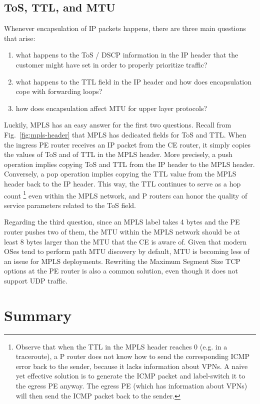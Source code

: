 \documentclass{article}
\begin{document}
%
%
\subsection{ToS, TTL, and MTU}
Whenever encapsulation of IP packets happens, there are three main questions 
that arise:
\begin{enumerate}
 \item what happens to the ToS / DSCP information in the IP header that the 
customer might have set in order to properly prioritize traffic?
 \item what happens to the TTL field in the IP header and how does 
encapsulation cope with forwarding loops?
 \item how does encapsulation affect MTU for upper layer protocols?
\end{enumerate}

Luckily, MPLS has an easy answer for the first two questions. Recall from 
Fig.~\ref{fig:mpls-header} that MPLS has dedicated fields for ToS and TTL. When 
the ingress PE router receives an IP packet from the CE router, it simply copies 
the values of ToS and of TTL in the MPLS header. More precisely, a push operation 
implies copying ToS and TTL from the IP header to the MPLS header. Conversely, a 
pop operation implies copying the TTL value from the MPLS header back to the IP 
header. This way, the TTL continues to serve as a hop count%
% 
\footnote{Observe that when the TTL in the MPLS header reaches $0$ (e.g. in a 
traceroute), a P router does not know how to send the corresponding ICMP error 
back to the sender, because it lacks information about VPNs. A naive yet 
effective solution is to generate the ICMP packet and label-switch it to the 
egress PE anyway. The egress PE (which has information about VPNs) will then 
send the ICMP packet back to the sender.} 
% 
even within the MPLS network, and P routers can honor the quality of service 
parameters related to the ToS field.

Regarding the third question, since an MPLS label takes 4 bytes and the PE 
router pushes two of them, the MTU within the MPLS network should be at least 8 
bytes larger than the MTU that the CE is aware of. Given that modern OSes tend 
to perform path MTU discovery by default, MTU is becoming less of an issue for 
MPLS deployments. Rewriting the Maximum Segment Size TCP options at the PE router is also a 
common solution, even though it does not support UDP traffic.


\section{Summary}\label{sec:summary}
\end{document}
